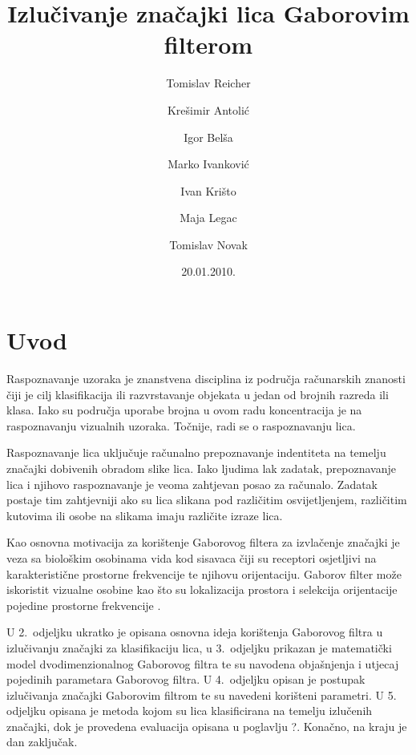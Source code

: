 \documentclass{article}
\begin{document}
\title{Izlučivanje značajki lica Gaborovim filterom}
\author{Tomislav Reicher \and Krešimir Antolić \and Igor Belša \and Marko Ivanković \and Ivan Krišto \and Maja Legac \and Tomislav Novak}
\date{20.01.2010.}
\maketitle

\tableofcontents

\section{Uvod}
Raspoznavanje uzoraka je znanstvena disciplina iz područja računarskih znanosti
čiji je cilj klasifikacija ili razvrstavanje objekata u jedan od brojnih razreda
ili klasa. Iako su područja uporabe brojna u ovom radu koncentracija je na
raspoznavanju vizualnih uzoraka. Točnije, radi se o raspoznavanju lica.

Raspoznavanje lica uključuje računalno prepoznavanje indentiteta na temelju
značajki dobivenih obradom slike lica. Iako ljudima lak zadatak, prepoznavanje
lica i njihovo raspoznavanje je veoma zahtjevan posao za računalo. Zadatak
postaje tim zahtjevniji ako su lica slikana pod različitim osvijetljenjem,
različitim kutovima ili osobe na slikama imaju različite izraze lica.

Kao osnovna motivacija za korištenje Gaborovog filtera za izvlačenje značajki je
veza sa biološkim osobinama vida kod sisavaca čiji su receptori osjetljivi na
karakteristične prostorne frekvencije te njihovu orijentaciju. Gaborov filter
može iskoristit vizualne osobine kao što su lokalizacija prostora i selekcija
orijentacije pojedine prostorne frekvencije
\citep{bhuiyan2007onfacerecognition}\nocite{daugman1985uncertainty}.

U 2.~odjeljku ukratko je opisana osnovna ideja korištenja Gaborovog
filtra u izlučivanju značajki za klasifikaciju lica, u 3.~odjeljku prikazan je
matematički model dvodimenzionalnog Gaborovog filtra te su navodena objašnjenja
i utjecaj pojedinih parametara Gaborovog filtra. U 4.~odjeljku opisan je
postupak izlučivanja značajki Gaborovim filtrom te su navedeni korišteni
parametri. U 5. odjeljku opisana je metoda kojom su lica klasificirana na temelju
izlučenih značajki, dok je provedena evaluacija opisana u poglavlju ?. Konačno, na
kraju je dan zaključak.
\end{document}
